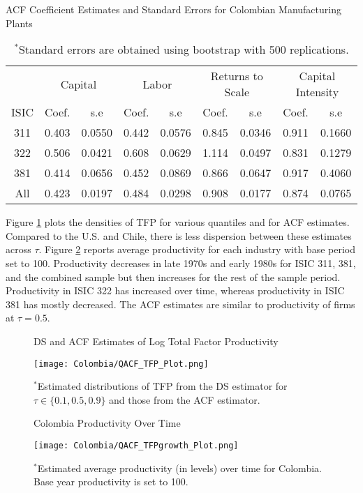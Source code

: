 \documentclass[12pt]{article}
\begin{document}
\begin{table}[H]
\centering
\caption{ACF Coefficient Estimates and Standard Errors for Colombian Manufacturing Plants}
\small
\begin{tabular}{ccccccccc}
  \hline\hline & \multicolumn{2}{c}{Capital} & \multicolumn{2}{c}{Labor} & \multicolumn{2}{c}{Returns to Scale} & \multicolumn{2}{c}{Capital Intensity}\\ \cmidrule(lr){2-3} \cmidrule(lr){4-5} \cmidrule(lr){6-7} \cmidrule(lr){8-9}ISIC & Coef. & s.e & Coef. & s.e & Coef. & s.e & Coef. & s.e \\ 
  \hline
311 & 0.403 & 0.0550 & 0.442 & 0.0576 & 0.845 & 0.0346 & 0.911 & 0.1660 \\ 
  322 & 0.506 & 0.0421 & 0.608 & 0.0629 & 1.114 & 0.0497 & 0.831 & 0.1279 \\ 
  381 & 0.414 & 0.0656 & 0.452 & 0.0869 & 0.866 & 0.0647 & 0.917 & 0.4060 \\ 
  All & 0.423 & 0.0197 & 0.484 & 0.0298 & 0.908 & 0.0177 & 0.874 & 0.0765 \\ 
   \hline
\end{tabular}
\caption*{\footnotesize $^{*}$Standard errors are obtained using bootstrap with 500 replications.}
\label{COLACF}
\end{table}

Figure \ref{fig:QACFCOLTFP} plots the densities of TFP for various quantiles and for ACF estimates. Compared to the U.S. and Chile, there is less dispersion between these estimates across $\tau$. Figure \ref{fig:QACFCOLTFPG} reports average productivity for each industry with base period set to 100. Productivity decreases in late 1970s and early 1980s for ISIC 311, 381, and the combined sample but then increases for the rest of the sample period. Productivity in ISIC 322 has increased over time, whereas productivity in ISIC 381 has mostly decreased. The ACF estimates are similar to productivity of firms at $\tau=0.5$. 

\begin{figure}[H]
\centering
\caption{DS and ACF Estimates of Log Total Factor Productivity}
\texttt{[image: Colombia/QACF\_TFP\_Plot.png]}
\caption*{\footnotesize $^{*}$Estimated distributions of TFP from the DS estimator for $\tau \in \{0.1, 0.5, 0.9\}$ and those from  the ACF estimator.}
\label{fig:QACFCOLTFP}
\end{figure}

\begin{figure}[H]
\centering
\caption{Colombia Productivity Over Time}
\texttt{[image: Colombia/QACF\_TFPgrowth\_Plot.png]}
\caption*{\footnotesize $^{*}$Estimated average productivity (in levels) over time for Colombia. Base year productivity is set to 100.}
\label{fig:QACFCOLTFPG}
\end{figure}
\end{document}
